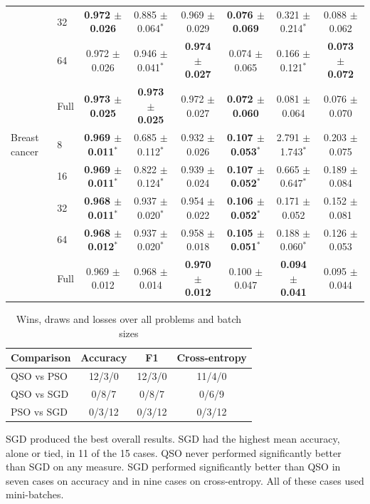 \documentclass[conference]{IEEEtran}
\begin{document}
\begin{table}[t]
\begin{tabular}{llcccccc}
 & 32 & \textbf{0.972 $\pm$ 0.026} & 0.885 $\pm$ 0.064$^{*}$ & 0.969 $\pm$ 0.029 & \textbf{0.076 $\pm$ 0.069} & 0.321 $\pm$ 0.214$^{*}$ & 0.088 $\pm$ 0.062 \\
 & 64 & 0.972 $\pm$ 0.026 & 0.946 $\pm$ 0.041$^{*}$ & \textbf{0.974 $\pm$ 0.027} & 0.074 $\pm$ 0.065 & 0.166 $\pm$ 0.121$^{*}$ & \textbf{0.073 $\pm$ 0.072} \\
 & Full & \textbf{0.973 $\pm$ 0.025} & \textbf{0.973 $\pm$ 0.025} & 0.972 $\pm$ 0.027 & \textbf{0.072 $\pm$ 0.060} & 0.081 $\pm$ 0.064 & 0.076 $\pm$ 0.070 \\
\midrule
Breast cancer & 8 & \textbf{0.969 $\pm$ 0.011}$^{*}$ & 0.685 $\pm$ 0.112$^{*}$ & 0.932 $\pm$ 0.026 & \textbf{0.107 $\pm$ 0.053}$^{*}$ & 2.791 $\pm$ 1.743$^{*}$ & 0.203 $\pm$ 0.075 \\
 & 16 & \textbf{0.969 $\pm$ 0.011}$^{*}$ & 0.822 $\pm$ 0.124$^{*}$ & 0.939 $\pm$ 0.024 & \textbf{0.107 $\pm$ 0.052}$^{*}$ & 0.665 $\pm$ 0.647$^{*}$ & 0.189 $\pm$ 0.084 \\
 & 32 & \textbf{0.968 $\pm$ 0.011}$^{*}$ & 0.937 $\pm$ 0.020$^{*}$ & 0.954 $\pm$ 0.022 & \textbf{0.106 $\pm$ 0.052}$^{*}$ & 0.171 $\pm$ 0.052 & 0.152 $\pm$ 0.081 \\
 & 64 & \textbf{0.968 $\pm$ 0.012}$^{*}$ & 0.937 $\pm$ 0.020$^{*}$ & 0.958 $\pm$ 0.018 & \textbf{0.105 $\pm$ 0.051}$^{*}$ & 0.188 $\pm$ 0.060$^{*}$ & 0.126 $\pm$ 0.053 \\
 & Full & 0.969 $\pm$ 0.012 & 0.968 $\pm$ 0.014 & \textbf{0.970 $\pm$ 0.012} & 0.100 $\pm$ 0.047 & \textbf{0.094 $\pm$ 0.041} & 0.095 $\pm$ 0.044 \\
\bottomrule
\end{tabular}
\end{table}

\begin{table}[t]
\centering
\caption{Wins, draws and losses over all problems and batch sizes}
\label{tab:wdl}
\begin{tabular}{lccc}
\toprule
Comparison & Accuracy & F1 & Cross-entropy \\
\midrule
QSO vs PSO & 12/3/0 & 12/3/0 & 11/4/0 \\
QSO vs SGD & 0/8/7  & 0/8/7  & 0/6/9  \\
PSO vs SGD & 0/3/12 & 0/3/12 & 0/3/12 \\
\bottomrule
\end{tabular}
\end{table}

SGD produced the best overall results. SGD had the highest mean
accuracy, alone or tied, in 11 of the 15 cases. QSO never performed significantly
better than SGD on any measure. SGD performed significantly better
than QSO in seven cases on accuracy and in nine cases on
cross-entropy. All of these cases used mini-batches.
\end{document}
